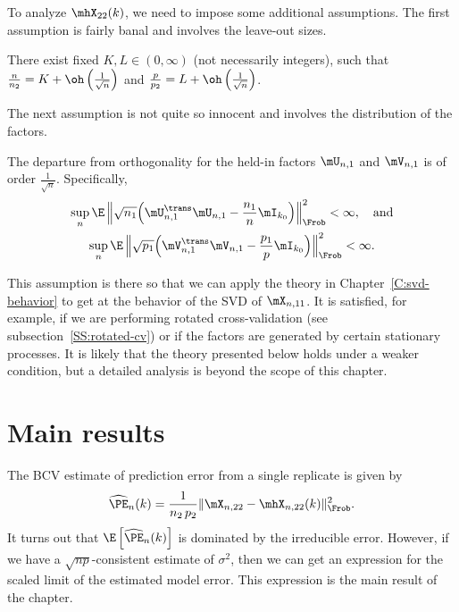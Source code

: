 To analyze $\mhX_{22}(k)$, we need to impose some additional assumptions.
The first assumption is fairly banal and involves the leave-out sizes.

\begin{assumption}
    There exist fixed $K, L \in (0, \infty)$ (not necessarily integers),
    such that
    $\frac{n}{n_2} = K + \oh\left(\frac{1}{\sqrt{n}}\right)$ and 
	$\frac{p}{p_2} = L + \oh\left(\frac{1}{\sqrt{n}}\right)$.
\end{assumption}

\noindent
The next assumption is not quite so innocent and involves the distribution of the factors.

\begin{assumption}\label{A:held-in-orthog}
    The departure from orthogonality for the held-in factors $\mU_{n,1}$
    and $\mV_{n,1}$ is of order $\frac{1}{\sqrt{n}}$.  Specifically,
    \begin{gather*}
        \sup_n 
        \E \, \Big\| 
            \sqrt{n_1} 
            \Big( 
                \mU_{n,1}^\trans \mU_{n,1} 
                -
                \frac{n_1}{n} \mI_{k_0}
            \Big)
        \Big\|_\Frob^2
        <
        \infty, \quad\text{and} \\
        \sup_n
        \E \, \Big\| 
            \sqrt{p_1} 
            \Big( 
                \mV_{n,1}^\trans \mV_{n,1} 
                -
                \frac{p_1}{p} \mI_{k_0}
            \Big)
        \Big\|_\Frob^2
        <
        \infty.
    \end{gather*}
\end{assumption}

\noindent
This assumption is there so that we can apply the theory in Chapter~\ref{C:svd-behavior} to get at the behavior of the SVD of $\mX_{n,11}$.  It is satisfied, for example, if we are performing rotated cross-validation (see subsection~\ref{SS:rotated-cv}) or if the factors are generated by certain stationary processes.  It is likely that the theory presented below holds under a weaker condition, but a detailed analysis is beyond the scope of this chapter.


\section{Main results}\label{S:bcv-theory-results}

The BCV estimate of prediction error from a single replicate is given
by
\begin{equation}
	\widehat{\PE}_n(k)
		=
			\frac{1}{n_2 \, p_2}
			\| \mX_{n,22} - \mhX_{n,22}(k) \|_\Frob^2.
\end{equation}
It turns out that
\(
	\E\left[
		\widehat{\PE}_n(k)
	\right]
\)
is dominated by the irreducible error.  However, if we have a $\sqrt{n p}$-consistent estimate of $\sigma^2$, then we can get an expression for
the scaled limit of the estimated model error.  This expression is the main result of the chapter.

